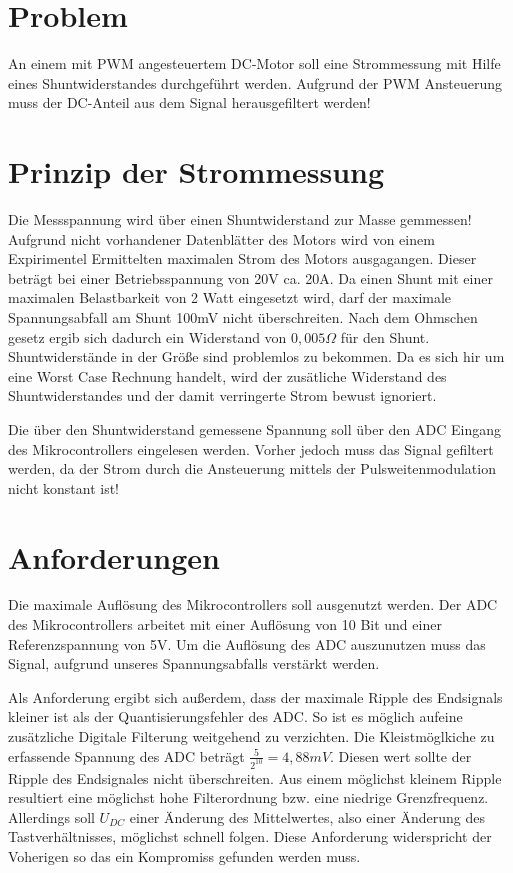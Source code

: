 \documentclass[11pt,twoside,a4paper,openright]{mpreport}
\begin{document}
\section{Problem}

An einem mit PWM angesteuertem DC-Motor soll eine Strommessung mit Hilfe eines Shuntwiderstandes
durchgeführt werden. Aufgrund der PWM Ansteuerung muss der DC-Anteil aus dem Signal herausgefiltert werden!


\section{Prinzip der Strommessung}

Die Messspannung wird über einen Shuntwiderstand zur Masse gemmessen! Aufgrund nicht vorhandener Datenblätter des Motors
wird von einem Expirimentel Ermittelten maximalen Strom des Motors ausgagangen. Dieser beträgt bei einer Betriebsspannung von 20V ca. 20A.
Da einen Shunt mit einer maximalen Belastbarkeit von 2 Watt eingesetzt wird, darf der maximale Spannungsabfall am Shunt 100mV nicht überschreiten.
Nach dem Ohmschen gesetz ergib sich dadurch ein Widerstand von $0,005 \Omega$  für den Shunt. Shuntwiderstände in der Größe sind problemlos zu bekommen.
Da es sich hir um eine Worst Case Rechnung handelt, wird der zusätliche Widerstand des Shuntwiderstandes und der damit verringerte Strom bewust ignoriert.

Die über den Shuntwiderstand gemessene Spannung soll über den ADC Eingang des Mikrocontrollers eingelesen werden. Vorher jedoch muss das Signal gefiltert werden, da der Strom
durch die Ansteuerung mittels der Pulsweitenmodulation nicht konstant ist!



\section{Anforderungen}
Die maximale Auflösung des Mikrocontrollers soll ausgenutzt werden. Der ADC des Mikrocontrollers arbeitet mit einer Auflösung von 10 Bit und einer 
Referenzspannung von 5V. Um die Auflösung des ADC auszunutzen muss das Signal, aufgrund unseres Spannungsabfalls verstärkt werden.

Als Anforderung ergibt sich außerdem, dass der maximale Ripple des Endsignals kleiner ist als der Quantisierungsfehler des ADC.
So ist es möglich aufeine zusätzliche Digitale Filterung weitgehend zu verzichten.
Die Kleistmöglkiche zu erfassende Spannung des ADC beträgt $\frac{5}{2^{10}}=4,88mV$.
Diesen wert sollte der Ripple des Endsignales nicht überschreiten.
Aus einem möglichst kleinem Ripple resultiert eine möglichst hohe Filterordnung bzw. eine niedrige Grenzfrequenz.
Allerdings soll $U_{DC}$ einer Änderung des Mittelwertes, also einer Änderung des Tastverhältnisses, möglichst
schnell folgen. Diese Anforderung widerspricht der Voherigen so das ein Kompromiss gefunden werden muss.
\end{document}
